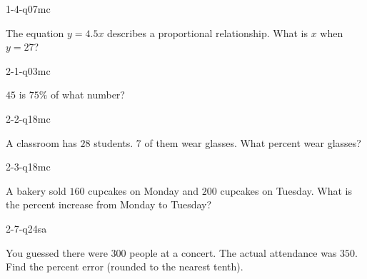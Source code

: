 
\begin{practiceQuestion}{1-4-q07}{mc}
\begin{questionText}
The equation $y = 4.5x$ describes a proportional relationship. What is $x$ when $y = 27$?
\end{questionText}
\end{practiceQuestion}

\begin{practiceQuestion}{2-1-q03}{mc}
\begin{questionText}
$45$ is $75\%$ of what number?
\end{questionText}
\end{practiceQuestion}

\begin{practiceQuestion}{2-2-q18}{mc}
\begin{questionText}
A classroom has $28$ students. $7$ of them wear glasses. What percent wear glasses?
\end{questionText}
\end{practiceQuestion}

\begin{practiceQuestion}{2-3-q18}{mc}
\begin{questionText}
A bakery sold $160$ cupcakes on Monday and $200$ cupcakes on Tuesday. What is the percent increase from Monday to Tuesday?


\end{questionText}
\end{practiceQuestion}

\begin{practiceQuestion}{2-7-q24}{sa}
\begin{questionText}
You guessed there were $300$ people at a concert. The actual attendance was $350$. Find the percent error (rounded to the nearest tenth).
\end{questionText}
\end{practiceQuestion}

